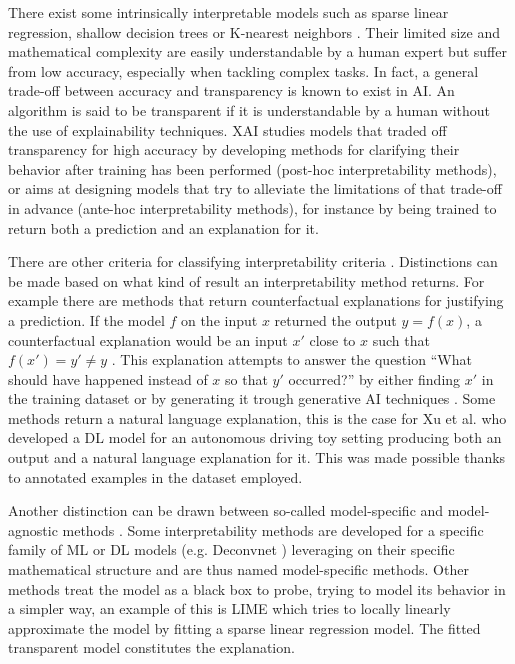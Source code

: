 There exist some intrinsically interpretable models such as sparse linear regression, shallow decision trees or K-nearest neighbors \cite{molnar2022} \cite{XAI_review}.
Their limited size and mathematical complexity are easily understandable by a human expert but suffer from low accuracy, especially when tackling complex tasks.
In fact, a general trade-off between accuracy and transparency is known to exist in AI.
An algorithm is said to be transparent if it is understandable by a human without the use of explainability techniques.
XAI studies models that traded off transparency for high accuracy by developing methods for clarifying their behavior after training has been performed (post-hoc interpretability methods), or aims at designing models that try to alleviate the limitations of that trade-off in advance (ante-hoc interpretability methods), for instance by being trained to return both a prediction and an explanation for it. 

There are other criteria for classifying interpretability criteria \cite{molnar2022}.
Distinctions can be made based on what kind of result an interpretability method returns.
For example there are methods that return counterfactual explanations for justifying a prediction.
If the model $f$ on the input $x$ returned the output $y = f(x)$, a counterfactual explanation would be an input $x'$ close to $x$ such that $f(x') = y' \neq y$ \cite{Zablocki2022}.
This explanation attempts to answer the question “What should have happened instead of $x$ so that $y'$ occurred?” by either finding $x'$ in the training dataset or by generating it trough generative AI techniques \cite{Zablocki2022}.
Some methods return a natural language explanation, this is the case for Xu et al. \cite{9157111} who developed a DL model for an autonomous driving toy setting producing both an output and a natural language explanation for it.
This was made possible thanks to annotated examples in the dataset employed. 

Another distinction can be drawn between so-called model-specific and model-agnostic methods \cite{molnar2022}.
Some interpretability methods are developed for a specific family of ML or DL models (e.g. Deconvnet \cite{Deconvnet}) leveraging on their specific mathematical structure and are thus named model-specific methods.
Other methods treat the model as a black box to probe, trying to model its behavior in a simpler way, an example of this is LIME \cite{LIME} which tries to locally linearly approximate the model by fitting a sparse linear regression model.
The fitted transparent model constitutes the explanation.

